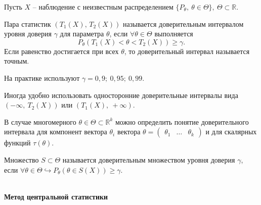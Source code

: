 Пусть $\displaystyle X$ -- наблюдение с неизвестным распределением $\displaystyle \{P_{\theta } ,\ \theta \in \Theta \} ,\ \Theta \subset \mathbb{R}$. 

\begin{definition}
    Пара статистик $\displaystyle ( T_{1}( X),\,T_{2}( X))$ называется доверительным интервалом уровня доверия $\displaystyle \gamma $ для параметра $\displaystyle \theta $, если $\displaystyle \forall \theta \in \Theta $ выполняется
\begin{equation*}
    P_\theta( T_{1}( X) < \theta < T_{2}( X)) \geqslant \gamma .
\end{equation*}
Если равенство достигается при всех $\displaystyle \theta $, то доверительный интервал называется точным.
\end{definition}
\begin{note}
    На практике используют $\displaystyle \gamma =0,9;\ 0,95;\ 0,99$.
\end{note}
Иногда удобно использовать односторонние доверительные интервалы вида $\displaystyle ( -\infty ,\ T_{2}( X))$ или $\displaystyle ( T_{1}( X) ,\ +\infty )$.

В случае многомерного $\displaystyle \theta \in \Theta \subset \mathbb{R}^{k}$ можно определить понятие доверительного интервала для компонент вектора $\displaystyle \theta _{i}$ вектора $\displaystyle \theta =\begin{pmatrix}
\theta _{1} & \dotsc  & \theta _{k}
\end{pmatrix}$ и для скалярных функций $\displaystyle \tau ( \theta )$.
\begin{definition}
    Множество $\displaystyle S\subset \Theta $ называется доверительным множеством уровня доверия $\displaystyle \gamma $, если $\displaystyle \forall \theta \in \Theta \hookrightarrow P_{\theta }( \theta \in S( X)) \geqslant \gamma $.
\end{definition}\\

\textbf{Метод центральной статистики}\\


